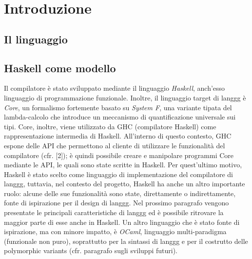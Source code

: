 \documentclass[10pt,a4paper]{article}
\begin{document}
\textwidth=450pt\oddsidemargin=0pt

\section{Introduzione}

\subsection{Il linguaggio}

\subsection{Haskell come modello}
Il compilatore è stato sviluppato mediante il linguaggio \textit{Haskell}, anch'esso linguaggio di programmazione funzionale.
Inoltre, il linguaggio target di langgg è \textit{Core}, un formalismo fortemente basato su \textit{System F}, una
variante tipata del lambda-calcolo che introduce un meccanismo di quantificazione universale sui tipi. Core, inoltre,
viene utilizzato da GHC (compilatore Haskell) come rappresentazione intermedia di Haskell. All'interno di questo
contesto, GHC espone delle API che permettono al cliente di utilizzare le funzionalità del compilatore (cfr. [2]); è quindi
possibile creare e manipolare programmi Core mediante le API, le quali sono state scritte in Haskell. Per quest'ultimo
motivo, Haskell è stato scelto come linguaggio di implementazione del compilatore di langgg, tuttavia, nel contesto
del progetto, Haskell ha anche un altro importante ruolo: alcune delle sue funzionalità sono state, direttamente
o indirettamente, fonte di ispirazione per il design di langgg. Nel prossimo paragrafo vengono presentate le principali
caratteristiche di langgg ed è possibile ritrovare la maggior parte di esse anche in Haskell. Un altro linguaggio
che è stato fonte di ispirazione, ma con minore impatto, è \textit{OCaml}, linguaggio multi-paradigma (funzionale non
puro), soprattutto per la sintassi di langgg e per il costrutto delle polymorphic variants (cfr. paragrafo sugli
sviluppi futuri).
\end{document}
